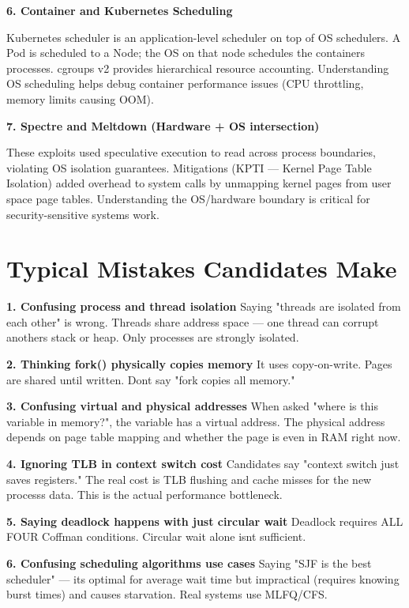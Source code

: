 \documentclass[11pt]{article}
\begin{document}
\textbf{6. Container and Kubernetes Scheduling}

Kubernetes scheduler is an application-level scheduler on top of OS schedulers. A Pod is scheduled to a Node; the OS on that node schedules the container\textquotesingle s processes. cgroups v2 provides hierarchical resource accounting. Understanding OS scheduling helps debug container performance issues (CPU throttling, memory limits causing OOM).

\textbf{7. Spectre and Meltdown (Hardware + OS intersection)}

These exploits used speculative execution to read across process boundaries, violating OS isolation guarantees. Mitigations (KPTI --- Kernel Page Table Isolation) added overhead to system calls by unmapping kernel pages from user space page tables. Understanding the OS/hardware boundary is critical for security-sensitive systems work.

\section{Typical Mistakes Candidates Make}\label{typical-mistakes-candidates-make}

\textbf{1. Confusing process and thread isolation}
Saying "threads are isolated from each other" is wrong. Threads share address space --- one thread can corrupt another\textquotesingle s stack or heap. Only processes are strongly isolated.

\textbf{2. Thinking fork() physically copies memory}
It uses copy-on-write. Pages are shared until written. Don\textquotesingle t say "fork copies all memory."

\textbf{3. Confusing virtual and physical addresses}
When asked "where is this variable in memory?", the variable has a virtual address. The physical address depends on page table mapping and whether the page is even in RAM right now.

\textbf{4. Ignoring TLB in context switch cost}
Candidates say "context switch just saves registers." The real cost is TLB flushing and cache misses for the new process\textquotesingle s data. This is the actual performance bottleneck.

\textbf{5. Saying deadlock happens with just circular wait}
Deadlock requires ALL FOUR Coffman conditions. Circular wait alone isn\textquotesingle t sufficient.

\textbf{6. Confusing scheduling algorithms\textquotesingle{} use cases}
Saying "SJF is the best scheduler" --- it\textquotesingle s optimal for average wait time but impractical (requires knowing burst times) and causes starvation. Real systems use MLFQ/CFS.
\end{document}
